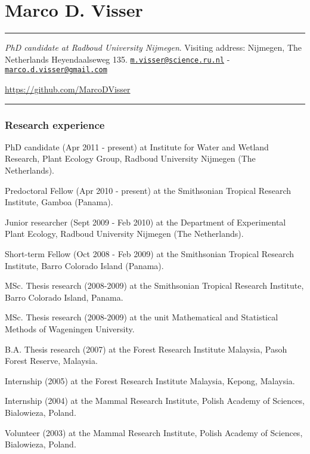 \section{Marco D. Visser}\label{marco-d.-visser}

\begin{center}\rule{0.5\linewidth}{\linethickness}\end{center}

\emph{PhD candidate at Radboud University Nijmegen}. Visiting address:
Nijmegen, The Netherlands Heyendaalseweg 135.
\href{mailto:m.visser@science.ru.nl}{\nolinkurl{m.visser@science.ru.nl}}
-
\href{mailto:marco.d.visser@gmail.com}{\nolinkurl{marco.d.visser@gmail.com}}

\url{https://github.com/MarcoDVisser}

\begin{center}\rule{0.5\linewidth}{\linethickness}\end{center}

\subsubsection{Research experience}\label{research-experience}

\begin{description}
\tightlist
\item[Since 2011]
PhD candidate (Apr 2011 - present) at Institute for Water and Wetland
Research, Plant Ecology Group, Radboud University Nijmegen (The
Netherlands).

Predoctoral Fellow (Apr 2010 - present) at the Smithsonian Tropical
Research Institute, Gamboa (Panama).
\item[2009 - 2010]
Junior researcher (Sept 2009 - Feb 2010) at the Department of
Experimental Plant Ecology, Radboud University Nijmegen (The
Netherlands).
\item[2008-2009]
Short-term Fellow (Oct 2008 - Feb 2009) at the Smithsonian Tropical
Research Institute, Barro Colorado Island (Panama).

MSc. Thesis research (2008-2009) at the Smithsonian Tropical Research
Institute, Barro Colorado Island, Panama.

MSc. Thesis research (2008-2009) at the unit Mathematical and
Statistical Methods of Wageningen University.
\item[2007]
B.A. Thesis research (2007) at the Forest Research Institute Malaysia,
Pasoh Forest Reserve, Malaysia.
\item[2005]
Internship (2005) at the Forest Research Institute Malaysia, Kepong,
Malaysia.
\item[2004]
Internship (2004) at the Mammal Research Institute, Polish Academy of
Sciences, Bialowieza, Poland.
\item[2003]
Volunteer (2003) at the Mammal Research Institute, Polish Academy of
Sciences, Bialowieza, Poland.
\end{description}


